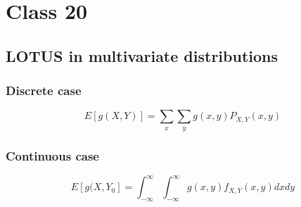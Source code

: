 \chapter{Class 20}

\section{LOTUS in multivariate distributions}

\subsection{Discrete case}
\[
   E\left[ g(X, Y) \right]  = \sum_{x} \sum_{y} g(x, y) P_{X, Y}(x, y)
\] 

\subsection{Continuous case}
\[
E\left[ g(X, Y_0\right]  = \int_{-\infty}^{\infty} \int_{-\infty}^{\infty} g (x, y) f_{X, Y}(x, y) dx dy
\] 


